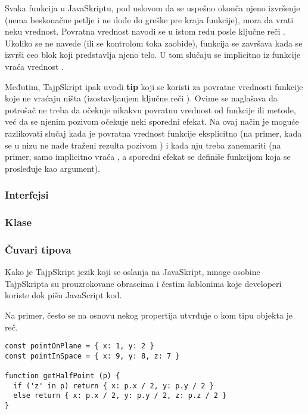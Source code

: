 Svaka funkcija u JavaSkriptu, pod uslovom da se uspešno okonča njeno izvršenje (nema beskonačne petlje i ne dođe do greške pre kraja funkcije), mora da vrati neku vrednost.
Povratna vrednost navodi se u istom redu posle ključne reči .
Ukoliko se  ne navede (ili se kontrolom toka zaobiđe), funkcija se završava kada se izvrši ceo blok koji predstavlja njeno telo.
U tom slučaju se implicitno iz funkcije vraća vrednost .

Međutim, TajpSkript ipak uvodi \textbf{tip } koji se koristi za povratne vrednosti funkcije koje ne vraćaju ništa (izostavljanjem ključne reči ).
Ovime se naglašava da potrošač ne treba da očekuje nikakvu povratnu vrednost od funkcije ili metode, već da se njenim pozivom očekuje neki sporedni efekat.
Na ovaj način je moguće razlikovati slučaj kada je povratna vrednost funkcije eksplicitno  (na primer, kada se u nizu ne nađe traženi rezulta pozivom ) i kada nju treba zanemariti (na primer,  samo implicitno vraća , a sporedni efekat se definiše funkcijom koja se prosleđuje kao argument).

\subsubsection{Interfejsi}


\subsubsection{Klase}

\subsubsection{Čuvari tipova}

Kako je TajpSkript jezik koji se oslanja na JavaSkript, mnoge osobine TajpSkripta su prouzrokovane obrascima i čestim šablonima koje developeri koriste dok pišu JavaScript kod.

Na primer, često se na osnovu nekog propertija utvrđuje o kom tipu objekta je reč.

\begin{verbatim}
const pointOnPlane = { x: 1, y: 2 }
const pointInSpace = { x: 9, y: 8, z: 7 }

function getHalfPoint (p) {
  if ('z' in p) return { x: p.x / 2, y: p.y / 2 }
  else return { x: p.x / 2, y: p.y / 2, z: p.z / 2 }
}
\end{verbatim}

